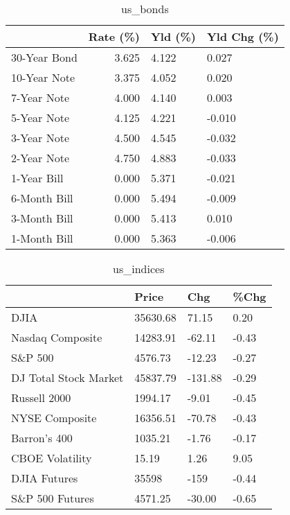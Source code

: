 \documentclass{article}%
\begin{document}
\begin{table}[htbp]%
\caption{us\_bonds}%
\centering%
\begin{adjustbox}{width=1\textwidth}%
\begin{tabular}{lrll}
\toprule
             &  Rate (\%) & Yld (\%) & Yld Chg (\%) \\
\midrule
30-Year Bond &     3.625 &   4.122 &       0.027 \\
10-Year Note &     3.375 &   4.052 &       0.020 \\
 7-Year Note &     4.000 &   4.140 &       0.003 \\
 5-Year Note &     4.125 &   4.221 &      -0.010 \\
 3-Year Note &     4.500 &   4.545 &      -0.032 \\
 2-Year Note &     4.750 &   4.883 &      -0.033 \\
 1-Year Bill &     0.000 &   5.371 &      -0.021 \\
6-Month Bill &     0.000 &   5.494 &      -0.009 \\
3-Month Bill &     0.000 &   5.413 &       0.010 \\
1-Month Bill &     0.000 &   5.363 &      -0.006 \\
\bottomrule
\end{tabular}
%
\end{adjustbox}%
\end{table}

%


\begin{table}[htbp]%
\caption{us\_indices}%
\centering%
\begin{adjustbox}{width=1\textwidth}%
\begin{tabular}{llll}
\toprule
                      &    Price &     Chg &  \%Chg \\
\midrule
                 DJIA & 35630.68 &   71.15 &  0.20 \\
     Nasdaq Composite & 14283.91 &  -62.11 & -0.43 \\
              S\&P 500 &  4576.73 &  -12.23 & -0.27 \\
DJ Total Stock Market & 45837.79 & -131.88 & -0.29 \\
         Russell 2000 &  1994.17 &   -9.01 & -0.45 \\
       NYSE Composite & 16356.51 &  -70.78 & -0.43 \\
         Barron's 400 &  1035.21 &   -1.76 & -0.17 \\
      CBOE Volatility &    15.19 &    1.26 &  9.05 \\
         DJIA Futures &    35598 &    -159 & -0.44 \\
      S\&P 500 Futures &  4571.25 &  -30.00 & -0.65 \\
\bottomrule
\end{tabular}
%
\end{adjustbox}%
\end{table}
\end{document}
